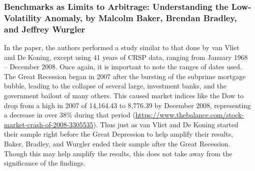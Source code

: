\documentclass[12pt,twoside]{reedthesis}
\theoremstyle{definition}
\theoremstyle{definition}
\theoremstyle{definition}
\theoremstyle{remark}
\begin{document}
\subsubsection{Benchmarks as Limits to Arbitrage: Understanding the
Low-Volatility Anomaly, by Malcolm Baker, Brendan Bradley, and Jeffrey
Wurgler}\label{benchmarks-as-limits-to-arbitrage-understanding-the-low-volatility-anomaly-by-malcolm-baker-brendan-bradley-and-jeffrey-wurgler}

In the paper, the authors performed a study similar to that done by van
Vliet and De Koning, except using 41 years of CRSP data, ranging from
January 1968 -- December 2008. Once again, it is important to note the
ranges of dates used. The Great Recession began in 2007 after the
bursting of the subprime mortgage bubble, leading to the collapse of
several large, investment banks, and the government bailout of many
others. This caused market indices like the Dow to drop from a high in
2007 of 14,164.43 to 8,776.39 by December 2008, representing a decrease
in over 38\% during that period
(\url{https://www.thebalance.com/stock-market-crash-of-2008-3305535}).
Thus just as van Vliet and De Koning started their sample right before
the Great Depression to help amplify their results, Baker, Bradley, and
Wurgler ended their sample after the Great Recession. Though this may
help amplify the results, this does not take away from the significance
of the findings.
\end{document}
